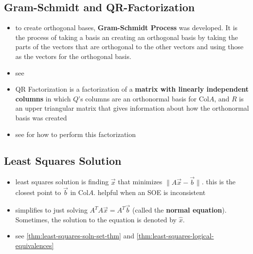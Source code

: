 \documentclass[a4paper,12pt]{article}
\theoremstyle{definition}
\theoremstyle{definition}
\newcommand{\norm}[1]{\lVert #1 \rVert}
\newcommand{\normaleq}{A^TA\vec{x} = A^T\vec{b}}
\begin{document}
	\subsection{Gram-Schmidt and QR-Factorization}
	\begin{itemize}
		\item to create orthogonal bases, \textbf{Gram-Schmidt Process} was developed. It is the process of taking a basis an creating an orthogonal basis by taking the parts of the vectors that are orthogonal to the other vectors and using those as the vectors for the orthogonal basis.
		
		\item see 
		
		\item QR Factorization is a factorization of a \textbf{matrix with  linearly independent columns} in which $Q$'s columns are an orthonormal basis for Col$A$, and $R$ is an upper triangular matrix that gives information about how the orthonormal basis was created
		
		\item see  for how to perform this factorization
	\end{itemize}
	
	\subsection{Least Squares Solution}
	\begin{itemize}
		\item least squares solution is finding $\vec{x}$ that minimizes $\norm{A\vec{x} - \vec{b}}$. this is the closest point to $\vec{b}$ in Col$A$. helpful when an SOE is inconsistent
		
		\item simplifies to just solving $\normaleq$ (called the \textbf{normal equation}). Sometimes, the solution to the equation is denoted by $\hat{x}$.
		
		\item see \autoref{thm:least-squares-soln-set-thm} and \autoref{thm:least-squares-logical-equivalences}
	\end{itemize}
	
\end{document}
